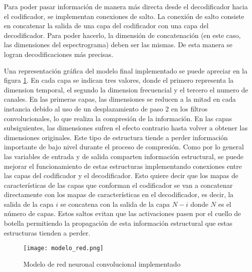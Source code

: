 Para poder pasar información de manera más directa desde el decodificador hacia el codificador, se implementan conexiones de salto. La conexión de salto consiste en concatenar la salida de una capa del codificador con una capa del decodificador. Para poder hacerlo, la dimensión de concatenación (en este caso, las dimensiones del espectrograma) deben ser las mismas. De esta manera se logran decodificaciones más precisas. 


Una representación gráfica del modelo final implementado se puede apreciar en la figura \ref{fig:modelo}. En cada capa se indican tres valores, donde el primero representa la dimension temporal, el segundo la dimension frecuencial y el tercero el numero de canales. En las primeras capas, las dimensiones se reducen a la mitad en cada instancia debido al uso de un desplazamiento de paso 2 en los filtros convolucionales, lo que realiza la compresión de la información. En las capas subsiguientes, las dimensiones sufren el efecto contrario hasta volver a obtener las dimensiones originales. Este tipo de estructura tiende a perder información importante de bajo nivel durante el proceso de compresión. Como por lo general las variables de entrada y de salida comparten información estructural, se puede mejorar el funcionamiento de estas estructuras implementando conexiones entre las capas del codificador y el decodificador. Esto quiere decir que los mapas de características de las capas que conforman el codificador se van a concatenar directamente con los mapas de características en el decodificador, es decir, la salida de la capa $i$ se concatena con la salida de la capa $N-i$ donde $N$ es el número de capas. Estos saltos evitan que las activaciones pasen por el cuello de botella permitiendo la propagación de esta información estructural que estas estructuras tienden a perder. 

\begin{figure}[H]
	\centering{}
	\texttt{[image: modelo\_red.png]}
	\caption{Modelo de red neuronal convolucional implementado}
	\label{fig:modelo}
\end{figure}

